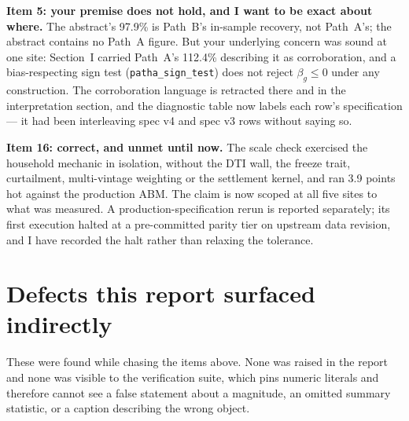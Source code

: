 \documentclass[11pt]{article}
\newcommand{\run}[1]{\texttt{#1}}
\begin{document}
\textbf{Item 5: your premise does not hold, and I want to be exact about where.}
The abstract's 97.9\% is Path~B's in-sample recovery, not Path~A's; the abstract
contains no Path~A figure. But your underlying concern was sound at one site:
Section~I carried Path~A's 112.4\% describing it as corroboration, and a
bias-respecting sign test (\run{patha\_sign\_test}) does not reject
$\beta_g \leq 0$ under any construction. The corroboration language is retracted
there and in the interpretation section, and the diagnostic table now labels each
row's specification --- it had been interleaving spec v4 and spec v3 rows without
saying so.

\textbf{Item 16: correct, and unmet until now.} The scale check exercised the
household mechanic in isolation, without the DTI wall, the freeze trait,
curtailment, multi-vintage weighting or the settlement kernel, and ran 3.9 points
hot against the production ABM. The claim is now scoped at all five sites to what
was measured. A production-specification rerun is reported separately; its first
execution halted at a pre-committed parity tier on upstream data revision, and I
have recorded the halt rather than relaxing the tolerance.

\section{Defects this report surfaced indirectly}

These were found while chasing the items above. None was raised in the report and
none was visible to the verification suite, which pins numeric literals and
therefore cannot see a false statement about a magnitude, an omitted summary
statistic, or a caption describing the wrong object.
\end{document}
